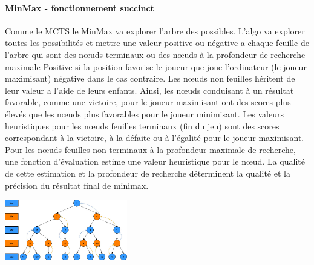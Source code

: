 \paragraph {MinMax - fonctionnement succinct}
Comme le MCTS le MinMax va explorer l'arbre des possibles. L'algo va explorer toutes les possibilités et mettre une valeur positive ou négative
a chaque feuille de l'arbre qui sont des nœuds terminaux ou des nœuds à la profondeur de recherche maximale Positive si la position favorise le joueur 
que joue l'ordinateur (le joueur maximisant) négative dans le cas contraire. Les nœuds non feuilles héritent de leur valeur a l'aide de leurs enfants.
Ainsi, les nœuds conduisant à un résultat favorable, comme une victoire, pour le joueur maximisant ont des scores plus élevés que les nœuds 
plus favorables pour le joueur minimisant. Les valeurs heuristiques pour les nœuds feuilles terminaux (fin du jeu) sont des scores correspondant 
à la victoire, à la défaite ou à l'égalité pour le joueur maximisant. Pour les nœuds feuilles non terminaux à la profondeur maximale de recherche, 
une fonction d'évaluation estime une valeur heuristique pour le nœud. La qualité de cette estimation et la profondeur de recherche déterminent la 
qualité et la précision du résultat final de minimax.

\includegraphics[width=0.4\textwidth]{root/MinMax.jpeg}